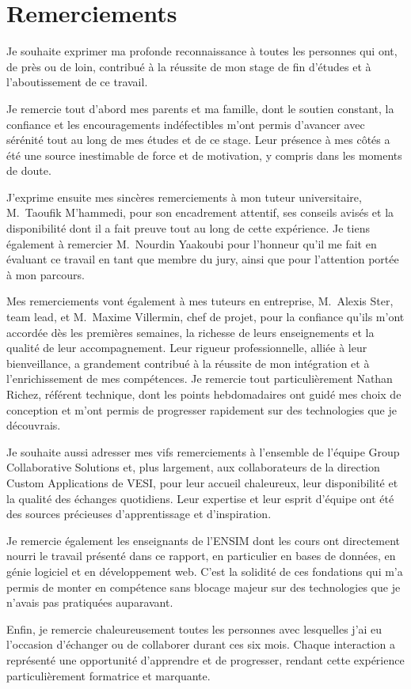 \chapter*{Remerciements}

Je souhaite exprimer ma profonde reconnaissance à toutes les personnes qui ont,
de près ou de loin, contribué à la réussite de mon stage de fin d'études et à
l'aboutissement de ce travail.

Je remercie tout d'abord mes parents et ma famille, dont le soutien constant, la
confiance et les encouragements indéfectibles m'ont permis d'avancer avec
sérénité tout au long de mes études et de ce stage. Leur présence à mes côtés a
été une source inestimable de force et de motivation, y compris dans les moments
de doute.

J'exprime ensuite mes sincères remerciements à mon tuteur universitaire,
M.~Taoufik M'hammedi, pour son encadrement attentif, ses conseils avisés et la
disponibilité dont il a fait preuve tout au long de cette expérience. Je tiens
également à remercier M.~Nourdin Yaakoubi pour l'honneur qu'il me fait en
évaluant ce travail en tant que membre du jury, ainsi que pour l'attention portée
à mon parcours.

Mes remerciements vont également à mes tuteurs en entreprise, M.~Alexis Ster,
team lead, et M.~Maxime Villermin, chef de projet, pour la confiance qu'ils
m'ont accordée dès les premières semaines, la richesse de leurs enseignements et
la qualité de leur accompagnement. Leur rigueur professionnelle, alliée à leur
bienveillance, a grandement contribué à la réussite de mon intégration et à
l'enrichissement de mes compétences. Je remercie tout particulièrement Nathan
Richez, référent technique, dont les points hebdomadaires ont guidé mes choix de
conception et m'ont permis de progresser rapidement sur des technologies que je
découvrais.

Je souhaite aussi adresser mes vifs remerciements à l'ensemble de l'équipe Group
Collaborative Solutions et, plus largement, aux collaborateurs de la direction
Custom Applications de VESI, pour leur accueil chaleureux, leur disponibilité et
la qualité des échanges quotidiens. Leur expertise et leur esprit d'équipe ont
été des sources précieuses d'apprentissage et d'inspiration.

Je remercie également les enseignants de l'ENSIM dont les cours ont directement
nourri le travail présenté dans ce rapport, en particulier en bases de données,
en génie logiciel et en développement web. C'est la solidité de ces fondations
qui m'a permis de monter en compétence sans blocage majeur sur des technologies
que je n'avais pas pratiquées auparavant.

Enfin, je remercie chaleureusement toutes les personnes avec lesquelles j'ai eu
l'occasion d'échanger ou de collaborer durant ces six mois. Chaque interaction a
représenté une opportunité d'apprendre et de progresser, rendant cette
expérience particulièrement formatrice et marquante.
